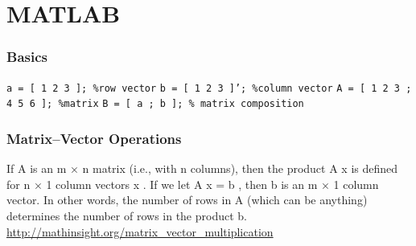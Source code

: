 \documentclass[11pt]{beamer}
\begin{document}
\section{MATLAB}

\begin{frame}[fragile]
  \frametitle{Basics}
  \Enlarge

  \begin{enumerate}
  \myitem  \texttt{a = [ 1 2 3 ]; \%row vector}
  \myitem  \texttt{b = [ 1 2 3 ]'; \%column vector}
  \myitem  \texttt{A = [ 1 2 3 ; 4 5 6 ]; \%matrix}
  \myitem  \texttt{B = [ a ; b ];  \% matrix composition}
  \end{enumerate}
\end{frame}



\begin{frame}[fragile]
	\frametitle{Matrix--Vector Operations}
	\Enlarge
	
	\begin{enumerate}
		\myitem If A is an m × n matrix (i.e., with n columns), then the product A x is defined for n × 1 column vectors x . If we let A x = b , then b is an m × 1 column vector. In other words, the number of rows in A (which can be anything) determines the number of rows in the product b. \url{http://mathinsight.org/matrix_vector_multiplication}
	\end{enumerate}
\end{frame}
\end{document}
